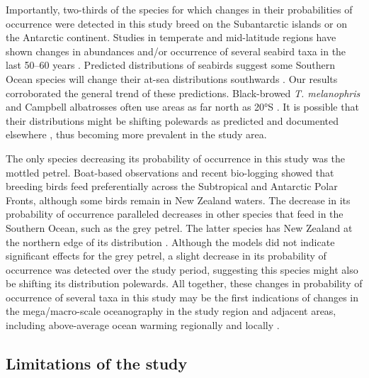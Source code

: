 \documentclass[preprint, 3p, authoryear]{elsarticle} %
\begin{document}
Importantly, two-thirds of the species for which changes in their probabilities of occurrence were detected in this study breed on the Subantarctic islands or on the Antarctic continent. Studies in temperate and mid-latitude regions have shown changes in abundances and/or occurrence of several seabird taxa in the last 50--60 years \citep{peron2010, kuletz2014, sojitra2022}. Predicted distributions of seabirds suggest some Southern Ocean species will change their at-sea distributions southwards \citep{kruger2018}. Our results corroborated the general trend of these predictions. Black-browed \emph{T. melanophris} and Campbell albatrosses often use areas as far north as 20°S \citep{waugh1999, thompson2021}. It is possible that their distributions might be shifting polewards as predicted \citep[e.g.][]{kruger2018} and documented elsewhere \citep{peron2010, sojitra2022}, thus becoming more prevalent in the study area.

The only species decreasing its probability of occurrence in this study was the mottled petrel. Boat-based observations \citep{ainley1979} and recent bio-logging \citep{sagar2019} showed that breeding birds feed preferentially across the Subtropical and Antarctic Polar Fronts, although some birds remain in New Zealand waters. The decrease in its probability of occurrence paralleled decreases in other species that feed in the Southern Ocean, such as the grey petrel. The latter species has New Zealand at the northern edge of its distribution \citep{torres2015}. Although the models did not indicate significant effects for the grey petrel, a slight decrease in its probability of occurrence was detected over the study period, suggesting this species might also be shifting its distribution polewards. All together, these changes in probability of occurrence of several taxa in this study may be the first indications of changes in the mega/macro-scale oceanography in the study region and adjacent areas, including above-average ocean warming regionally and locally \citep{pinkerton2023, sutton2024}.

\hypertarget{limitations-of-the-study}{%
\subsection{Limitations of the study}\label{limitations-of-the-study}}
\end{document}
